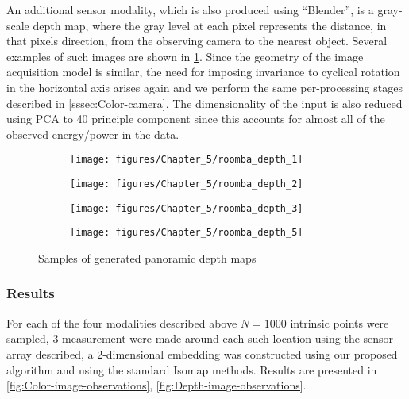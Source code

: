 	An additional sensor modality, which is also produced using ``Blender'', is a gray-scale depth map, where the gray level at each pixel represents the distance, in that pixels direction, from the observing camera to the nearest object. Several examples of such images are shown in \cref{fig:Panoramic-depth-images}. Since the geometry of the image acquisition model is similar, the need for imposing invariance to cyclical rotation in the horizontal axis arises again and we perform the same per-processing stages described in \cref{sssec:Color-camera}. The dimensionality of the input is also reduced using \ac{PCA} to 40 principle component since this accounts for almost all of the observed energy/power in the data.

	\begin{figure}[h]
		\begin{centering}
			\begin{subfigure}[t]{0.47\columnwidth}
				\texttt{[image: figures/Chapter\_5/roomba\_depth\_1]}
			\end{subfigure}\hfill
			\begin{subfigure}[t]{0.47\columnwidth}
				\texttt{[image: figures/Chapter\_5/roomba\_depth\_2]}
			\end{subfigure}
		\end{centering}
	
		\begin{centering}
			\begin{subfigure}[t]{0.47\columnwidth}
				\texttt{[image: figures/Chapter\_5/roomba\_depth\_3]}
			\end{subfigure}\hfill
			\begin{subfigure}[t]{0.47\columnwidth}
				\texttt{[image: figures/Chapter\_5/roomba\_depth\_5]}
			\end{subfigure}
		\end{centering}
		\caption{Samples of generated panoramic depth maps \label{fig:Panoramic-depth-images}}
	\end{figure}
	
		
	\subsubsection{Results}
	
	For each of the four modalities described above $N=1000$ intrinsic points were sampled, 3 measurement were made around each such location using the sensor array described, a 2-dimensional embedding was constructed using our proposed algorithm and using the standard Isomap methods. Results are presented in \cref{fig:Color-image-observations}, \cref{fig:Depth-image-observations}.
			
